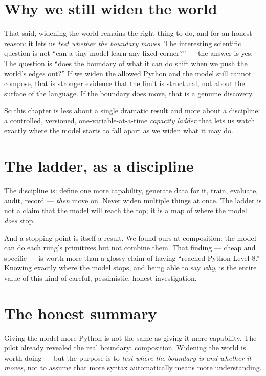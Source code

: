 \section{Why we still widen the
world}\label{why-we-still-widen-the-world}

That said, widening the world remains the right thing to do, and for an
honest reason: it lets us \emph{test whether the boundary moves}. The
interesting scientific question is not ``can a tiny model learn any
fixed corner?'' --- the answer is yes. The question is ``does the
boundary of what it can do shift when we push the world's edges out?''
If we widen the allowed Python and the model still cannot compose, that
is stronger evidence that the limit is structural, not about the surface
of the language. If the boundary does move, that is a genuine discovery.

So this chapter is less about a single dramatic result and more about a
discipline: a controlled, versioned, one-variable-at-a-time
\emph{capacity ladder} that lets us watch exactly where the model starts
to fall apart as we widen what it may do.

\section{The ladder, as a discipline}\label{the-ladder-as-a-discipline}

The discipline is: define one more capability, generate data for it,
train, evaluate, audit, record --- \emph{then} move on. Never widen
multiple things at once. The ladder is not a claim that the model will
reach the top; it is a map of where the model \emph{does} stop.

And a stopping point is itself a result. We found ours at composition:
the model can do each rung's primitives but not combine them. That
finding --- cheap and specific --- is worth more than a glossy claim of
having ``reached Python Level 8.'' Knowing exactly where the model
stops, and being able to say \emph{why}, is the entire value of this
kind of careful, pessimistic, honest investigation.

\section{The honest summary}\label{the-honest-summary}

Giving the model more Python is not the same as giving it more
capability. The pilot already revealed the real boundary: composition.
Widening the world is worth doing --- but the purpose is to \emph{test
where the boundary is and whether it moves}, not to assume that more
syntax automatically means more understanding.
